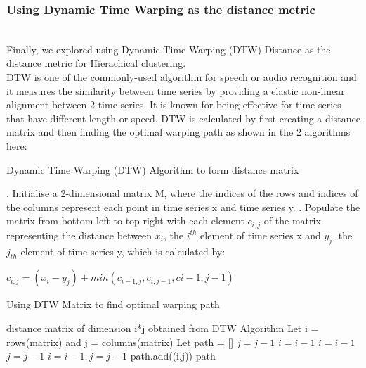 \documentclass[nonblindrev,msom]{informs3} %
\begin{document}
\subsubsection{Using Dynamic Time Warping as the distance metric}
\hfill\\
Finally, we explored using Dynamic Time Warping (DTW) Distance as the distance metric for Hierachical clustering. \\

\noindent DTW is one of the commonly-used algorithm for speech or audio recognition and it measures the similarity between time series by providing a elastic non-linear alignment between 2 time series. It is known for being effective for time series that have different length or speed. DTW is calculated by first creating a distance matrix and then finding the optimal warping path as shown in the 2 algorithms here:

\newpage
\begin{algorithm}[H]
\caption{Dynamic Time Warping (DTW) Algorithm to form distance matrix}
\begin{algorithmic}
\STATE 
{}. Initialise a 2-dimensional matrix M, where the indices of the rows and indices of the columns represent each point in time series x and time series y. 
. Populate the matrix from bottom-left to top-right with each element $c_{i,j}$ of the matrix representing the distance between $x_i$, the $i^{th}$ element of time series x and $y_j$, the $j_{th}$ element of time series y, which is calculated by:

\begin{center}
$c_{i,j} = (x_i - y_j) + min(c_{i-1,j}, c_{i,j-1}, c{i-1,j-1})$
\end{center}

\end{algorithmic}
\end{algorithm}

\begin{algorithm}[H]
\caption{Using DTW Matrix to find optimal warping path}
\begin{algorithmic}
\REQUIRE distance matrix of dimension i*j obtained from DTW Algorithm
\STATE Let i = rows(matrix) and j = columns(matrix)
\STATE Let path = []
\STATE $j = j-1$
\STATE $i = i-1$
\ELSE
{}
\STATE $i = i - 1$
\STATE $j = j - 1$
\ELSE
\STATE $i = i - 1, j = j - 1$
\ENDIF
path.add((i,j))
\ENDIF
\ENDWHILE
\RETURN path
\end{algorithmic}
\end{algorithm}
\end{document}
